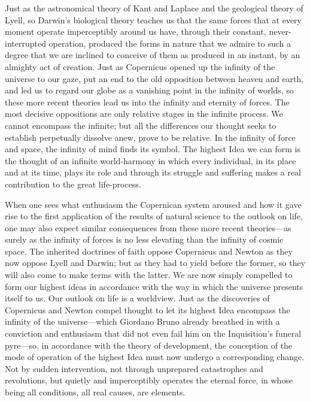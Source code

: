 \documentclass[12pt,a4paper]{article}
\begin{document}
Just as the astronomical theory of Kant and Laplace and the geological
theory of Lyell, so Darwin's biological theory teaches us that the
same forces that at every moment operate imperceptibly around us have,
through their constant, never-interrupted operation, produced the
forms in nature that we admire to such a degree that we are inclined
to conceive of them as produced in an instant, by an almighty act of
creation. Just as Copernicus opened up the infinity of the universe
to our gaze, put an end to the old opposition between heaven and
earth, and led us to regard our globe as a vanishing point in the
infinity of worlds, so these more recent theories lead us into the
infinity and eternity of forces. The most decisive oppositions are
only relative stages in the infinite process. We cannot encompass the
infinite; but all the differences our thought seeks to establish
perpetually dissolve anew, prove to be relative. In the infinity of
force and space, the infinity of mind finds its symbol. The highest
Idea we can form is the thought of an infinite world-harmony in which
every individual, in its place and at its time, plays its role and
through its struggle and suffering makes a real contribution to the
great life-process.

When one sees what enthusiasm the Copernican system aroused and how
it gave rise to the first application of the results of natural
science to the outlook on life, one may also expect similar
consequences from these more recent theories---as surely as the
infinity of forces is no less elevating than the infinity of
cosmic space. The inherited doctrines of faith oppose Copernicus and
Newton as they now oppose Lyell and Darwin; but as they had to yield
before the former, so they will also come to make terms with the
latter. We are now simply compelled to form our highest ideas in
accordance with the way in which the universe presents itself to us.
Our outlook on life is a worldview. Just as the discoveries of
Copernicus and Newton compel thought to let its highest Idea encompass
the infinity of the universe---which Giordano Bruno already breathed
in with a conviction and enthusiasm that did not even fail him on the
Inquisition's funeral pyre---so, in accordance with the theory of
development, the conception of the mode of operation of the highest
Idea must now undergo a corresponding change. Not by sudden
intervention, not through unprepared catastrophes and revolutions, but
quietly and imperceptibly operates the eternal force, in whose being
all conditions, all real causes, are elements.
\end{document}
